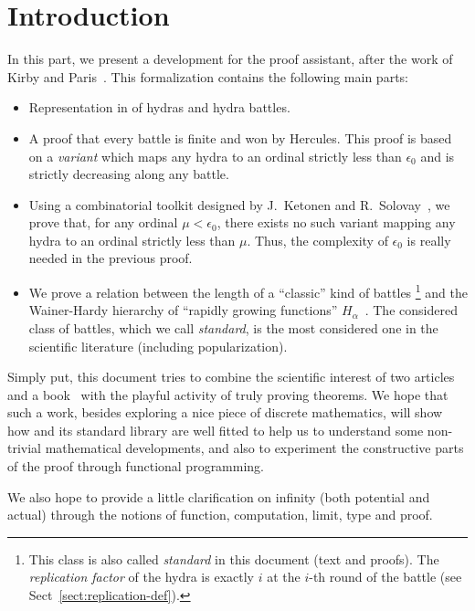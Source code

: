 \section*{Introduction}

In this part, we present a development  for the \coq{} proof assistant, after the work of Kirby and Paris~\cite{KP82}. This formalization contains the following main parts:

\begin{itemize}
\item Representation in \coq{} of hydras and hydra battles.
\item A proof that every battle is finite and won by Hercules. This proof is based on a \emph{variant} which maps any hydra to an ordinal strictly less than $\epsilon_0$ and is strictly decreasing along any battle.

\item Using a combinatorial toolkit designed by J.~Ketonen and R.~Solovay~\cite{KS81}, we prove that, for any ordinal $\mu<\epsilon_0$, there exists no such variant mapping any hydra to an ordinal strictly less than $\mu$. Thus, the complexity of $\epsilon_0$ is really needed in the previous proof.

\item We prove a relation between the length of a ``classic''  kind of  battles \footnote{This class is also called \emph{standard} in this document (text and proofs). The \emph{replication factor} of the hydra is exactly $i$ at the $i$-th round of the battle (see Sect~\vref{sect:replication-def}).}
and the Wainer-Hardy hierarchy of ``rapidly growing functions'' $H_\alpha$~\cite{Wainer1970}. The considered class of battles, which we call \emph{standard},  is the most considered one in the scientific  literature (including popularization).
\end{itemize}


Simply put, this document tries to combine the scientific interest of two articles~\cite{KP82, KS81} and a book~\cite{schutte} with the playful activity of truly proving theorems.
We hope  that such a work, besides exploring a nice piece of discrete mathematics,
will show how \coq{} and its standard library are well fitted to help us to understand some non-trivial mathematical developments, and also to experiment the constructive parts of  the proof through functional programming.

 We also hope to provide a little clarification on infinity (both potential and actual) through the notions of function, computation, limit,
 type and proof.

